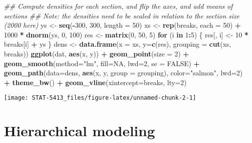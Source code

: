 \documentclass[]{book}
\newenvironment{Shaded}{\begin{snugshade}}{\end{snugshade}}
\newcommand{\CommentTok}[1]{\textcolor[rgb]{0.56,0.35,0.01}{\textit{#1}}}
\newcommand{\ControlFlowTok}[1]{\textcolor[rgb]{0.13,0.29,0.53}{\textbf{#1}}}
\newcommand{\DataTypeTok}[1]{\textcolor[rgb]{0.13,0.29,0.53}{#1}}
\newcommand{\DecValTok}[1]{\textcolor[rgb]{0.00,0.00,0.81}{#1}}
\newcommand{\KeywordTok}[1]{\textcolor[rgb]{0.13,0.29,0.53}{\textbf{#1}}}
\newcommand{\NormalTok}[1]{#1}
\newcommand{\OperatorTok}[1]{\textcolor[rgb]{0.81,0.36,0.00}{\textbf{#1}}}
\newcommand{\OtherTok}[1]{\textcolor[rgb]{0.56,0.35,0.01}{#1}}
\newcommand{\StringTok}[1]{\textcolor[rgb]{0.31,0.60,0.02}{#1}}
\begin{document}
\begin{Shaded}
\begin{Highlighting}[]
\CommentTok{## Compute densities for each section, and flip the axes, and add means of sections}
\CommentTok{## Note: the densities need to be scaled in relation to the section size (2000 here)}
\NormalTok{ys <-}\StringTok{ }\KeywordTok{seq}\NormalTok{(}\OperatorTok{-}\DecValTok{300}\NormalTok{, }\DecValTok{300}\NormalTok{, }\DataTypeTok{length =} \DecValTok{50}\NormalTok{)}
\NormalTok{xs <-}\StringTok{ }\KeywordTok{rep}\NormalTok{(breaks, }\DataTypeTok{each =} \DecValTok{50}\NormalTok{) }\OperatorTok{+}\StringTok{ }\DecValTok{1000} \OperatorTok{*}\StringTok{ }\KeywordTok{dnorm}\NormalTok{(ys, }\DecValTok{0}\NormalTok{, }\DecValTok{100}\NormalTok{)}
\NormalTok{res <-}\StringTok{ }\KeywordTok{matrix}\NormalTok{(}\DecValTok{0}\NormalTok{, }\DecValTok{50}\NormalTok{, }\DecValTok{5}\NormalTok{)}
\ControlFlowTok{for}\NormalTok{ (i }\ControlFlowTok{in} \DecValTok{1}\OperatorTok{:}\DecValTok{5}\NormalTok{) \{}
\NormalTok{  res[, i] <-}\StringTok{ }\DecValTok{10} \OperatorTok{*}\StringTok{ }\NormalTok{breaks[i] }\OperatorTok{+}\StringTok{ }\NormalTok{ys }
\NormalTok{\}}
\NormalTok{dens <-}\StringTok{ }\KeywordTok{data.frame}\NormalTok{(}\DataTypeTok{x =}\NormalTok{ xs, }\DataTypeTok{y=}\KeywordTok{c}\NormalTok{(res), }
                   \DataTypeTok{grouping =} \KeywordTok{cut}\NormalTok{(xs, breaks))}
\KeywordTok{ggplot}\NormalTok{(dat, }\KeywordTok{aes}\NormalTok{(x, y)) }\OperatorTok{+}
\StringTok{  }\KeywordTok{geom_point}\NormalTok{(}\DataTypeTok{size =} \DecValTok{2}\NormalTok{) }\OperatorTok{+}
\StringTok{  }\KeywordTok{geom_smooth}\NormalTok{(}\DataTypeTok{method=}\StringTok{"lm"}\NormalTok{, }\DataTypeTok{fill=}\OtherTok{NA}\NormalTok{, }\DataTypeTok{lwd=}\DecValTok{2}\NormalTok{, }\DataTypeTok{se =} \OtherTok{FALSE}\NormalTok{) }\OperatorTok{+}
\StringTok{  }\KeywordTok{geom_path}\NormalTok{(}\DataTypeTok{data=}\NormalTok{dens, }\KeywordTok{aes}\NormalTok{(x, y, }\DataTypeTok{group =}\NormalTok{ grouping), }
            \DataTypeTok{color=}\StringTok{"salmon"}\NormalTok{, }\DataTypeTok{lwd=}\DecValTok{2}\NormalTok{) }\OperatorTok{+}
\StringTok{  }\KeywordTok{theme_bw}\NormalTok{() }\OperatorTok{+}
\StringTok{  }\KeywordTok{geom_vline}\NormalTok{(}\DataTypeTok{xintercept=}\NormalTok{breaks, }\DataTypeTok{lty=}\DecValTok{2}\NormalTok{)}
\end{Highlighting}
\end{Shaded}

\texttt{[image: STAT-5413\_files/figure-latex/unnamed-chunk-2-1]}

\hypertarget{hierarchical-modeling}{%
\section{Hierarchical modeling}\label{hierarchical-modeling}}
\end{document}
